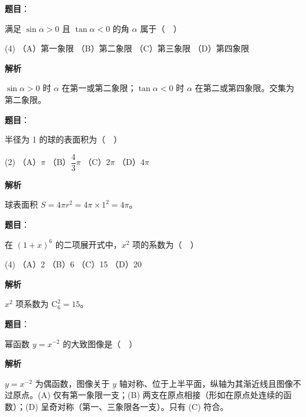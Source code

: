 \begin{answer}

\textbf{题目}：

满足 \(\sin\alpha>0\) 且 \(\tan\alpha<0\) 的角 \(\alpha\) 属于（　）

\begin{gkopts}(4)
\task （A）第一象限
\task （B）第二象限
\task （C）第三象限
\task （D）第四象限
\end{gkopts}

\textbf{解析}

\(\sin\alpha>0\) 时 \(\alpha\) 在第一或第二象限；\(\tan\alpha<0\) 时 \(\alpha\) 在第二或第四象限。交集为第二象限。


\end{answer}
\begin{answer}

\textbf{题目}：

半径为 1 的球的表面积为（　）

\begin{gkopts}(2)
\task （A）\(\pi\)
\task （B）\(\dfrac{4}{3}\pi\)
\task （C）\(2\pi\)
\task （D）\(4\pi\)
\end{gkopts}

\textbf{解析}

球表面积 \(S=4\pi r^{2}=4\pi\times 1^{2}=4\pi\)。


\end{answer}
\begin{answer}

\textbf{题目}：

在 \((1+x)^{6}\) 的二项展开式中，\(x^{2}\) 项的系数为（　）

\begin{gkopts}(4)
\task （A）2
\task （B）6
\task （C）15
\task （D）20
\end{gkopts}

\textbf{解析}

\(x^{2}\) 项系数为 \(\mathrm{C}_{6}^{2}=15\)。


\end{answer}
\begin{answer}

\textbf{题目}：

幂函数 \(y=x^{-2}\) 的大致图像是（　）
\nopagebreak[4]
\begin{center}\end{center}
\nopagebreak[4]
\textbf{解析}

\(y=x^{-2}\) 为偶函数，图像关于 \(y\) 轴对称、位于上半平面，纵轴为其渐近线且图像不过原点。(A) 仅有第一象限一支；(B) 两支在原点相接（形如在原点处连续的函数）；(D) 呈奇对称（第一、三象限各一支）。只有 (C) 符合。


\end{answer}
